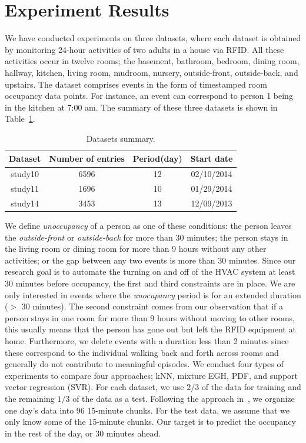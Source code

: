 \section{Experiment Results}
We have conducted experiments on three datasets, where each dataset is obtained by monitoring 24-hour activities of two adults in a house via RFID. 
All these activities occur in twelve rooms; the basement, bathroom, bedroom, dining room, hallway, kitchen, living room, mudroom, nursery, outside-front, outside-back, and upstairs. 
The dataset comprises events in the form of timestamped room occupancy data points. For instance, an event can correspond to person 1 being in the kitchen at 7:00 am. The summary of these three datasets is shown in Table~\ref{tab_dataset}. 
\begin{table}[h]
\centering
\caption {Datasets summary.} \label{tab_dataset}
\begin{tabular} {|c|c|c|c|}
\hline
Dataset & Number of entries & Period(day) & Start date\\
\hline
study10  & 6596 & 12 & 02/10/2014\\
\hline
study11  & 1696 & 10 & 01/29/2014\\
\hline
study14 & 3453 & 13 & 12/09/2013\\
\hline
\end{tabular}
\end{table}
We define \textit{unoccupancy} of a person as one of these conditions: the person leaves the {\em outside-front} or {\em outside-back} for more than 30 minutes; the person stays in the living room or dining room for more than 9 hours without any other activities; or the gap between any two events is more than 30 minutes. 
Since our research goal is to automate the turning on and off of the HVAC system at least 30 minutes before occupancy, the first and third constraints are in place. We are only interested in events where the {\em unocupancy} period is for an extended duration ($>$ 30 minutes). The second constraint comes from our observation that if a person stays in one room for more than 9 hours without moving to other rooms, 
this usually means that the person has gone out but left the RFID equipment at home. 
Furthermore, we delete events with a duration less than 
2 minutes since these correspond to the individual walking back and forth across rooms and generally do not contribute to meaningful episodes. We conduct four types of experiments to compare four approaches; 
kNN, mixture EGH, PDF, and support vector regression (SVR). 
For each dataset, we use $2/3$ of the data for training and the remaining $1/3$ of the data as a test. 
Following the approach in~\cite{scott2011preheat},
we organize one day's data into 96 15-minute chunks. 
For the test data, we assume that we only know some of the 15-minute chunks. Our target is to predict the occupancy in the rest of the day, or 30 minutes ahead. 

